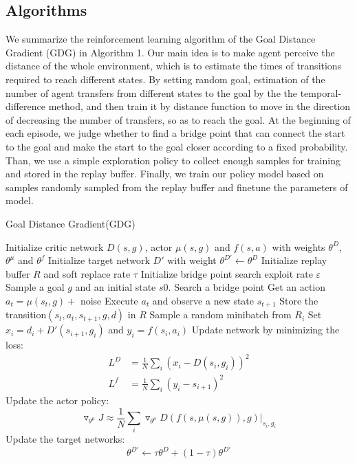 \documentclass[8pt,twoside,a4paper]{article}
\begin{document}
\subsection{Algorithms}
We summarize the reinforcement learning algorithm of the Goal Distance Gradient (GDG) in Algorithm 1. Our main idea is to make agent perceive the distance of the whole environment, which is to estimate the times of transitions required to reach different states. By setting random goal, estimation of the number of agent transfers from different states to the goal by the the temporal-difference method, and then train it by distance function to move in the direction of decreasing the number of transfers, so as to reach the goal. At the beginning of each episode, we judge whether to find a bridge point that can connect the start to the goal and make the start to the goal closer according to a fixed probability. Than, we use a simple exploration policy to collect enough samples for training and stored in the replay buffer. Finally, we train our policy model based on samples randomly sampled from the replay buffer and finetune the parameters of model.
\begin{algorithm}[tb]
	\caption{Goal Distance Gradient(GDG)}
	\begin{algorithmic}[1]
		\STATE Initialize critic network $D(s,g)$, actor $\mu(s,g)$ and $f(s,a)$ with weights $\theta^{D}$, $\theta^{\mu}$ and $\theta^{f}$
		\STATE Initialize target network ${D}'$ with weight $\theta^{D'} \leftarrow \theta^{D}$
		\STATE Initialize replay buffer $R$ and soft replace rate $\tau$
		\STATE Initialize bridge point search exploit rate $\varepsilon$
			\STATE Sample a goal $g$ and an initial state $s0$.	
				\STATE Search a bridge point
			\ENDIF
				\STATE Get an action $a_t = \mu(s_t,g)+$ noise
				\STATE Execute $a_t$ and observe a new state $s_{t+1}$
				\STATE Store the transition$(s_{t},a_{t},s_{t+1},g,d)$ in $R$
			\ENDFOR
			\STATE Sample a random minibatch from $R_i$
			\STATE Set $x_{i}=d_{i}+D'(s_{i+1},g_{i})$ and $y_{i}=f(s_{i},a_{i})$
			\STATE Update network by minimizing the loss:
		 	\[
			\begin{aligned}
			L^{D}&=\frac{1}{N}\sum_{i}(x_{i}-D(s_{i},g_{i}))^{2}\\
			L^{f}&=\frac{1}{N}\sum_{i}(y_{i}-s_{i+1})^{2}
			\end{aligned}
			\]
			\STATE Update the actor policy:
			 \[
			\triangledown_{\theta^{\mu}}J\approx\frac{1}{N}\sum_{i}\triangledown_{\theta^{\mu}}D(f(s,\mu(s,g)),g)|_{s_i,g_i}
			\]
			\STATE Update the target networks:
			 \[
			 \theta^{D'} \leftarrow \tau \theta^{D} + (1-\tau) \theta^{D'}
			\]
			\ENDFOR
		\ENDFOR
		
	\end{algorithmic}
\end{algorithm}
\end{document}
